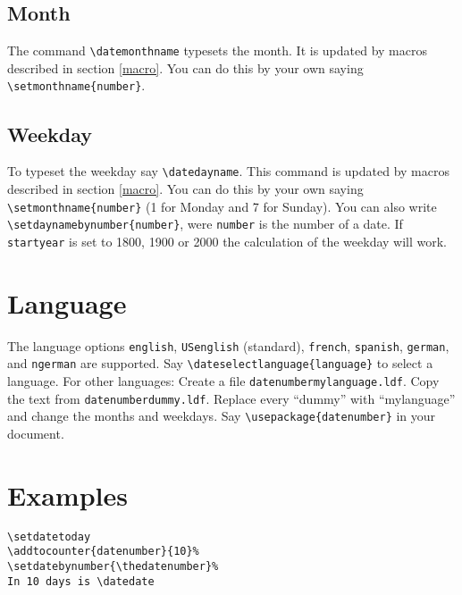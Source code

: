 \subsection{Month\label{monthname}}
The command \verb+\datemonthname+ typesets the month. It is updated by macros described in section \ref{macro}. You can do this by your own saying \verb+\setmonthname{number}+.

\subsection{Weekday\label{dayname}}
To typeset the weekday say \verb+\datedayname+. This command is updated by macros described in section \ref{macro}.
You can do this by your own saying \verb+\setmonthname{number}+ (1 for Monday and 7 for Sunday). You can also write \verb+\setdaynamebynumber{number}+, were \verb+number+ is the number of a date. If \texttt{startyear} is set to 1800, 1900 or 2000 the calculation of the weekday will work.

\section{Language}

The language options \texttt{english}, \texttt{USenglish} (standard), \texttt{french}, \texttt{spanish}, \texttt{german}, and \texttt{ngerman} are supported. Say \verb+\dateselectlanguage{language}+ to select a language. For other languages: Create a file \texttt{datenumbermylanguage.ldf}. Copy the text from \texttt{datenumberdummy.ldf}. Replace every ``dummy'' with ``mylanguage'' and change the months and weekdays. Say \verb+\usepackage{datenumber}+ \verb++ in your document.

\section{Examples}

\begin{teX}
\thedatenumber
\end{teX}




\begin{verbatim}
\setdatetoday
\addtocounter{datenumber}{10}%
\setdatebynumber{\thedatenumber}%
In 10 days is \datedate
\end{verbatim}

\setdatetoday
\addtocounter{datenumber}{10}%
\setdatebynumber{\thedatenumber}%

